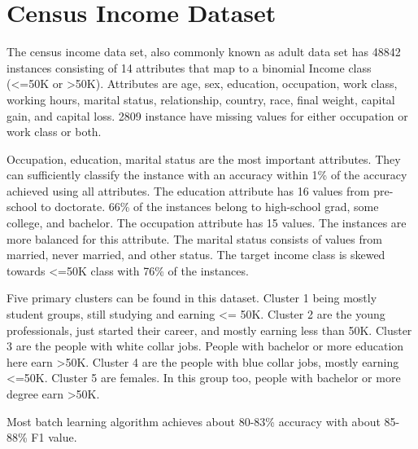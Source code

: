 \chapter{Census Income Dataset}
\label{appndx:ci}

The census income data set, also commonly known as adult data set has 48842 instances consisting of 14 attributes that map to a binomial Income class (<=50K or >50K). Attributes are age, sex, education, occupation, work class, working hours, marital status, relationship, country, race, final weight, capital gain, and capital loss. 2809 instance have missing values for either occupation or work class or both.

Occupation, education, marital status are the most important attributes. They can sufficiently classify the instance with an accuracy within 1\% of the accuracy achieved using all attributes. The education attribute has 16 values from pre-school to doctorate. 66\% of the instances belong to high-school grad, some college, and bachelor. The occupation attribute has 15 values. The instances are  more balanced for this attribute. The marital status consists of values from married, never married, and other status. The target income class is skewed towards <=50K class with 76\% of the instances.

Five primary clusters can be found in this dataset. Cluster 1 being mostly student groups, still studying and earning <= 50K. Cluster 2 are the young professionals, just started their career, and mostly earning less than 50K. Cluster 3 are the people with white collar jobs. People with bachelor or more education here earn >50K. Cluster 4 are the people with blue collar jobs, mostly earning <=50K. Cluster 5 are females. In this group too, people with bachelor or more degree earn >50K.

Most batch learning algorithm achieves about 80-83\% accuracy with about 85-88\% F1 value.